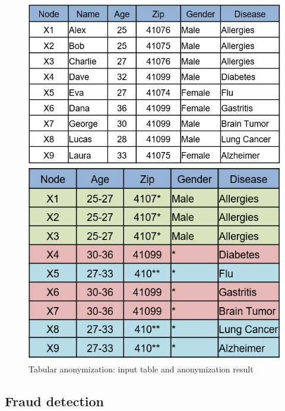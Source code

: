 	
	\begin{figure}[H]
		\centering
		\begin{minipage}[b]{0.5\textwidth}
			\includegraphics[width=\textwidth]{figures/anonym/k_anon_input}
		\end{minipage}
		\hfill
		\begin{minipage}[b]{0.418\textwidth}
			\includegraphics[width=\textwidth]{figures/anonym/k_anon_output}
		\end{minipage}
		\caption{Tabular anonymization: input table and anonymization result}
	\end{figure}	
	
	
	\subsection{Fraud detection}
	\label{ssect:fraud_detection}


